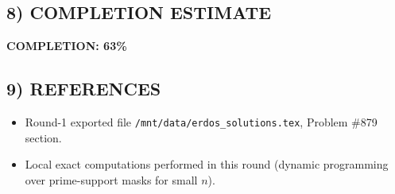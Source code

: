 \subsection*{8) COMPLETION ESTIMATE}
\noindent\textbf{COMPLETION: 63\%}

\subsection*{9) REFERENCES}
\begin{itemize}
\item Round-1 exported file \texttt{/mnt/data/erdos\_solutions.tex}, Problem \#879 section.
\item Local exact computations performed in this round (dynamic programming over prime-support masks for small $n$).
\end{itemize}
